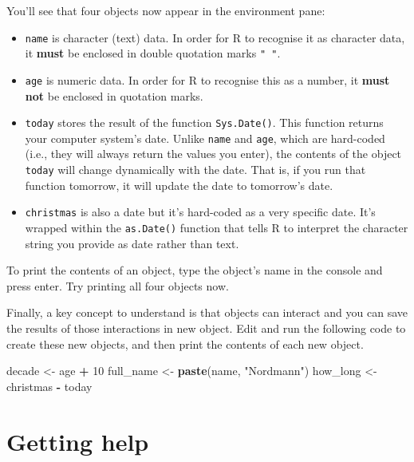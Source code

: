 \documentclass[
  oneside]{book}
\newenvironment{Shaded}{\begin{snugshade}}{\end{snugshade}}
\newcommand{\DecValTok}[1]{\textcolor[rgb]{0.00,0.00,0.81}{#1}}
\newcommand{\FunctionTok}[1]{\textcolor[rgb]{0.13,0.29,0.53}{\textbf{#1}}}
\newcommand{\NormalTok}[1]{#1}
\newcommand{\OtherTok}[1]{\textcolor[rgb]{0.56,0.35,0.01}{#1}}
\newcommand{\SpecialCharTok}[1]{\textcolor[rgb]{0.81,0.36,0.00}{\textbf{#1}}}
\newcommand{\StringTok}[1]{\textcolor[rgb]{0.31,0.60,0.02}{#1}}
\providecommand{\tightlist}{%
  \setlength{\itemsep}{0pt}\setlength{\parskip}{0pt}}
\begin{document}
You'll see that four objects now appear in the environment pane:

\begin{itemize}
\tightlist
\item
  \texttt{name} is character{} (text) data. In order for R to recognise it as character data, it \textbf{must} be enclosed in double quotation marks \texttt{"\ "}.
\item
  \texttt{age} is numeric{} data. In order for R to recognise this as a number, it \textbf{must not} be enclosed in quotation marks.
\item
  \texttt{today} stores the result of the function \texttt{Sys.Date()}. This function returns your computer system's date. Unlike \texttt{name} and \texttt{age}, which are hard-coded (i.e., they will always return the values you enter), the contents of the object \texttt{today} will change dynamically with the date. That is, if you run that function tomorrow, it will update the date to tomorrow's date.
\item
  \texttt{christmas} is also a date but it's hard-coded as a very specific date. It's wrapped within the \texttt{as.Date()} function that tells R to interpret the character string you provide as date rather than text.
\end{itemize}

\begin{try}
To print the contents of an object, type the object's name in the console and press enter. Try printing all four objects now.

\end{try}

Finally, a key concept to understand is that objects can interact and you can save the results of those interactions in new object. Edit and run the following code to create these new objects, and then print the contents of each new object.

\begin{Shaded}
\begin{Highlighting}[]
\NormalTok{decade }\OtherTok{\textless{}{-}}\NormalTok{ age }\SpecialCharTok{+} \DecValTok{10}
\NormalTok{full\_name }\OtherTok{\textless{}{-}} \FunctionTok{paste}\NormalTok{(name, }\StringTok{"Nordmann"}\NormalTok{)}
\NormalTok{how\_long }\OtherTok{\textless{}{-}}\NormalTok{ christmas }\SpecialCharTok{{-}}\NormalTok{ today}
\end{Highlighting}
\end{Shaded}

\section{Getting help}\label{help}
\end{document}
